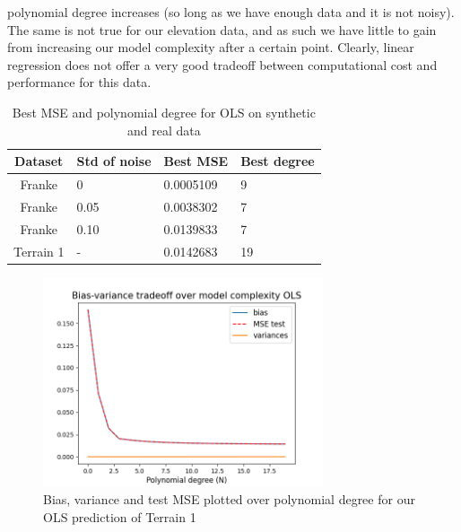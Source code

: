 \documentclass[twocolumn,10pt,cleanfoot]{asme2ej}
\begin{document}
polynomial degree increases (so long as we have enough data and it is not noisy). The same is not true for our elevation data, and as such we have little to gain from increasing our model complexity after a certain point. Clearly, linear regression does not offer a very good tradeoff between computational cost and performance for this data.

\begin{table}[t]
\caption{Best MSE and polynomial degree for OLS on synthetic and real data}
\begin{center}
\label{ols_mse_table_dif_data}
\begin{tabular}{c l l l}
Dataset & Std of noise & Best MSE & Best degree \\
\hline
Franke & 0 & 0.0005109 & 9\\
Franke & 0.05 & 0.0038302 & 7 \\
Franke & 0.10 & 0.0139833 & 7 \\
Terrain 1 & - & 0.0142683 & 19 \\
\hline
\end{tabular}
\end{center}
\end{table}

\begin{figure}[h]
\centerline{\includegraphics[width=3.25in]{figure/realbiasvarianceOLS.png}}
\caption{Bias, variance and test MSE plotted over polynomial degree for our OLS prediction of Terrain 1}
\label{realbiasvarianceOLS}
\end{figure}


\end{document}
